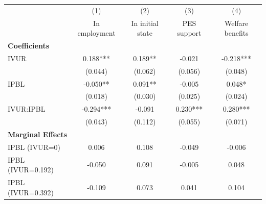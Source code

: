 \centering
\begin{tabular}{lcccc}
\hline
& (1) & (2) & (3) & (4) \\
& In employment & In initial state & PES support & Welfare benefits \\ 
\hline
\textbf{Coefficients} \\
IVUR & 0.188*** & 0.189** & -0.021 & -0.218*** \\
& (0.044) & (0.062) & (0.056) & (0.048) \\ 
IPBL & -0.050** & 0.091** & -0.005 & 0.048* \\
& (0.018) & (0.030) & (0.025) & (0.024) \\ 
IVUR:IPBL & -0.294*** & -0.091 & 0.230*** & 0.280*** \\
& (0.043) & (0.112) & (0.055) & (0.071) \\ 
\hline
\textbf{Marginal Effects} \\
IPBL (IVUR=0) & 0.006 & 0.108 & -0.049 & -0.006 \\
IPBL (IVUR=0.192) & -0.050 & 0.091 & -0.005 & 0.048 \\
IPBL (IVUR=0.392) & -0.109 & 0.073 & 0.041 & 0.104 \\
\hline
\end{tabular}